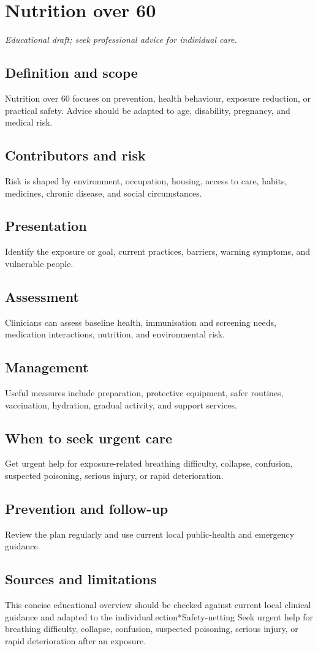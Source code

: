 \chapter{Nutrition over 60}

\medskip
\noindent\textit{Educational draft; seek professional advice for individual care.}

\section*{Definition and scope}
Nutrition over 60 focuses on prevention, health behaviour, exposure reduction, or practical safety. Advice should be adapted to age, disability, pregnancy, and medical risk.

\section*{Contributors and risk}
Risk is shaped by environment, occupation, housing, access to care, habits, medicines, chronic disease, and social circumstances.

\section*{Presentation}
Identify the exposure or goal, current practices, barriers, warning symptoms, and vulnerable people.

\section*{Assessment}
Clinicians can assess baseline health, immunisation and screening needs, medication interactions, nutrition, and environmental risk.

\section*{Management}
Useful measures include preparation, protective equipment, safer routines, vaccination, hydration, gradual activity, and support services.

\section*{When to seek urgent care}
Get urgent help for exposure-related breathing difficulty, collapse, confusion, suspected poisoning, serious injury, or rapid deterioration.

\section*{Prevention and follow-up}
Review the plan regularly and use current local public-health and emergency guidance.

\section*{Sources and limitations}
This concise educational overview should be checked against current local clinical guidance and adapted to the individual.ection*{Safety-netting}
Seek urgent help for breathing difficulty, collapse, confusion, suspected poisoning, serious injury, or rapid deterioration after an exposure.
